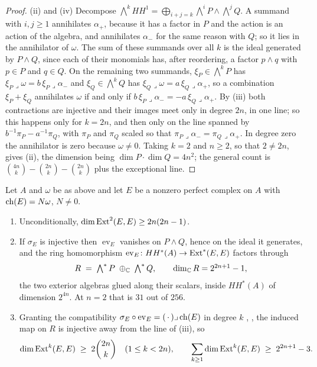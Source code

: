 \begin{proof}
(ii) and (iv) Decompose $\bigwedge^{k}HH^{1}=\bigoplus_{i+j=k}\bigwedge^{i}P
\wedge\bigwedge^{j}Q$. A summand with $i,j\ge1$ annihilates $\alpha_{+}$,
because it has a factor in $P$ and the action is an action of the algebra, and
annihilates $\alpha_{-}$ for the same reason with $Q$; so it lies in the
annihilator of $\omega$. The sum of these summands over all $k$ is the ideal
generated by $P\wedge Q$, since each of their monomials has, after
reordering, a factor $p\wedge q$ with $p\in P$ and $q\in Q$. On the remaining
two summands, $\xi_{P}\in\bigwedge^{k}P$ has
$\xi_{P}\lrcorner\omega=b\,\xi_{P}\lrcorner\alpha_{-}$ and
$\xi_{Q}\in\bigwedge^{k}Q$ has $\xi_{Q}\lrcorner\omega=a\,\xi_{Q}\lrcorner\alpha_{+}$,
so a combination $\xi_{P}+\xi_{Q}$ annihilates $\omega$ if and only if
$b\,\xi_{P}\lrcorner\alpha_{-}=-a\,\xi_{Q}\lrcorner\alpha_{+}$. By (iii) both
contractions are injective and their images meet only in degree $2n$, in one
line; so this happens only for $k=2n$, and then only on the line spanned by
$b^{-1}\pi_{P}-a^{-1}\pi_{Q}$, with $\pi_{P}$ and $\pi_{Q}$ scaled so that
$\pi_{P}\lrcorner\alpha_{-}=\pi_{Q}\lrcorner\alpha_{+}$. In degree zero the
annihilator is zero because $\omega\ne0$. Taking $k=2$ and $n\ge2$, so that
$2\ne2n$, gives (ii), the dimension being
$\dim P\cdot\dim Q=4n^{2}$; the general count is
$\binom{4n}{k}-\binom{2n}{k}-\binom{2n}{k}$ plus the exceptional line.
\end{proof}

\begin{corollary}
\label{cor:hhfactor}
Let $A$ and $\omega$ be as above and let $E$ be a nonzero perfect complex on
$A$ with $\operatorname{ch}(E)=N\omega$, $N\ne0$.
\begin{enumerate}[label=\textup{(\roman*)},leftmargin=2.6em,itemsep=2pt]
\item Unconditionally, $\dim\operatorname{Ext}^{2}(E,E)\ge2n(2n-1)$.
\item If $\sigma_{E}$ is injective then $\operatorname{ev}_{E}$ vanishes on
  $P\wedge Q$, hence on the ideal it generates, and the ring homomorphism
  $\operatorname{ev}_{E}\colon HH^{*}(A)\to\operatorname{Ext}^{*}(E,E)$ factors through
  \[
    R\;=\;\textstyle\bigwedge^{*}P\;\oplus_{\mathbb{C}}\;\bigwedge^{*}Q,
    \qquad \dim_{\mathbb{C}}R=2^{2n+1}-1,
  \]
  the two exterior algebras glued along their scalars, inside $HH^{*}(A)$ of
  dimension $2^{4n}$. At $n=2$ that is $31$ out of $256$.
\item Granting the compatibility
  $\sigma_{E}\circ\operatorname{ev}_{E}=(\,\cdot\,)\lrcorner\operatorname{ch}(E)$ in degree
  $k$ \cite{Cal05}, \cite{CRV12}, the induced map on $R$ is injective away
  from the line of (iii), so
  \[
    \dim\operatorname{Ext}^{k}(E,E)\;\ge\;2\binom{2n}{k}\quad(1\le k<2n),
    \qquad
    \sum_{k\ge1}\dim\operatorname{Ext}^{k}(E,E)\;\ge\;2^{2n+1}-3 .
  \]
\end{enumerate}
\end{corollary}

